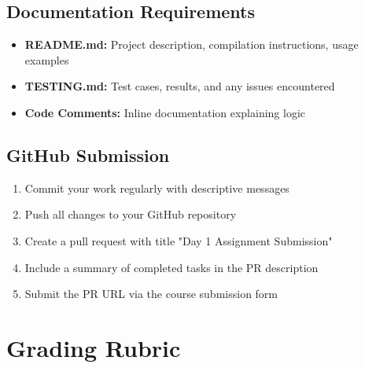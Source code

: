\documentclass[11pt,a4paper]{article}
\begin{document}
\subsection{Documentation Requirements}
\begin{itemize}
    \item \textbf{README.md:} Project description, compilation instructions, usage examples
    \item \textbf{TESTING.md:} Test cases, results, and any issues encountered
    \item \textbf{Code Comments:} Inline documentation explaining logic
\end{itemize}

\subsection{GitHub Submission}
\begin{enumerate}
    \item Commit your work regularly with descriptive messages
    \item Push all changes to your GitHub repository
    \item Create a pull request with title "Day 1 Assignment Submission"
    \item Include a summary of completed tasks in the PR description
    \item Submit the PR URL via the course submission form
\end{enumerate}

\section{Grading Rubric}
\end{document}
